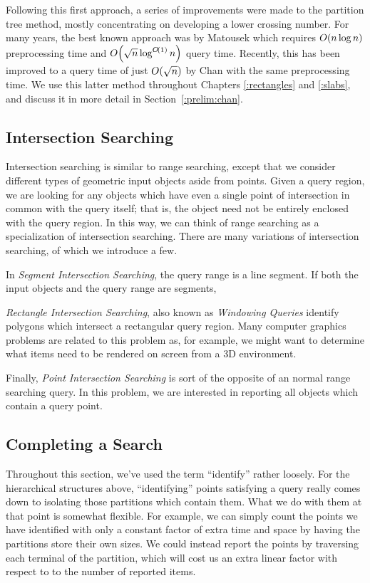 Following this first approach, a series of improvements were made to the partition tree method, mostly concentrating on developing a lower crossing number.
For many years, the best known approach was by Matousek\cite{Matousek92} which requires $O\!\left(n\log{n}\right)$ preprocessing time and $O\!\left(\sqrt{n}\log^{O\!\left(1\right)}{n}\right)$ query time.
Recently, this has been improved to a query time of just $O\!\left(\sqrt{n}\right)$ by Chan\cite{chan2012} with the same preprocessing time.
We use this latter method throughout Chapters \ref{:rectangles} and \ref{:slabs}, and discuss it in more detail in Section~\ref{:prelim:chan}.


\subsection*{Intersection Searching} 

Intersection searching is similar to range searching, except that we consider different types of geometric input objects aside from points.
Given a query region, we are looking for any objects which have even a single point of intersection in common with the query itself; that is, the object need not be entirely enclosed with the query region.
In this way, we can think of range searching as a specialization of intersection searching.
There are many variations of intersection searching, of which we introduce a few.

In \emph{Segment Intersection Searching}, the query range is a line segment. 
If both the input objects and the query range are segments, 

\emph{Rectangle Intersection Searching}, also known as \emph{Windowing Queries} identify polygons which intersect a rectangular query region. 
Many computer graphics problems are related to this problem as, for example, we might want to determine what items need to be rendered on screen from a 3D environment.

Finally, \emph{Point Intersection Searching} is sort of the opposite of an normal range searching query. In this problem, we are interested in reporting all objects which contain a query point.


\subsection*{Completing a Search}

Throughout this section, we've used the term ``identify'' rather loosely.
For the hierarchical structures above, ``identifying'' points satisfying a query really comes down to isolating those partitions which contain them.
What we do with them at that point is somewhat flexible.
For example, we can simply count the points we have identified with only a constant factor of extra time and space by having the partitions store their own sizes.
We could instead report the points by traversing each terminal of the partition, which will cost us an extra linear factor with respect to to the number of reported items.

